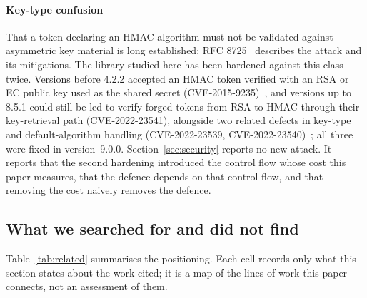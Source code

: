 \documentclass[preprint,12pt,authoryear]{elsarticle}
\begin{document}
\paragraph{Key-type confusion} That a token declaring an HMAC algorithm must
not be validated against asymmetric key material is long established; RFC
8725~\citep{rfc8725} describes the attack and its mitigations. The library
studied here has been hardened against this class twice. Versions before 4.2.2
accepted an HMAC token verified with an RSA or EC public key used as the
shared secret (CVE-2015-9235)~\citep{ghsa2015jsonwebtoken}, and versions up to
8.5.1 could still be led to verify forged tokens from RSA to HMAC through
their key-retrieval path (CVE-2022-23541), alongside two related defects in
key-type and default-algorithm handling (CVE-2022-23539,
CVE-2022-23540)~\citep{auth0bulletin2022}; all three were fixed in
version~9.0.0. Section~\ref{sec:security} reports no new attack. It reports
that the second hardening introduced the control flow whose cost this paper
measures, that the defence depends on that control flow, and that removing the
cost naively removes the defence.

\subsection{What we searched for and did not find}\label{sec:gaps}

Table~\ref{tab:related} summarises the positioning. Each cell records only what
this section states about the work cited; it is a map of the lines of work this
paper connects, not an assessment of them.
\end{document}
